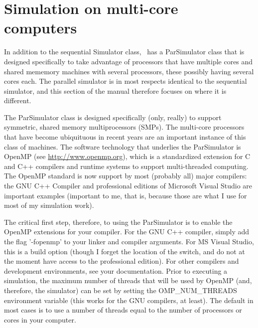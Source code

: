 \chapter{Simulation on multi-core computers}
In addition to the sequential Simulator class, \adevs\ has a ParSimulator class that is designed specifically to take advantage of processors that have multiple cores and shared mememory machines with several processors, these possibly having several cores each. The parallel simulator is in most respects identical to the sequential simulator, and this section of the manual therefore focuses on where it is different.

The ParSimulator class is designed specifically (only, really) to support symmetric, shared memory multiprocessors (SMPs). The multi-core processors that have become ubiquituous in recent years are an important instance of this class of machines. The software technology that underlies the ParSimulator is OpenMP (see \url{http://www.openmp.org}), which is a standardized extension for C and C++ compilers and runtime systems to support multi-threaded computing. The OpenMP standard is now support by most (probably all) major compilers: the GNU C++ Compiler and professional editions of Microsoft Visual Studio are important examples (important to me, that is, because those are what I use for most of my simulation work).

The critical first step, therefore, to using the ParSimulator is to enable the OpenMP extensions for your compiler. For the GNU C++ compiler, simply add the flag '-fopenmp' to your linker and compiler arguments. For MS Visual Studio, this is a build option (though I forget the location of the switch, and do not at the moment have access to the professional edition). For other compilers and development environments, see your documentation. Prior to executing a simulation, the maximum number of threads that will be used by OpenMP (and, therefore, the simulator) can be set by setting the OMP\_NUM\_THREADS environment variable (this works for the GNU compilers, at least). The default in most cases is to use a number of threads equal to the number of processors or cores in your computer.

